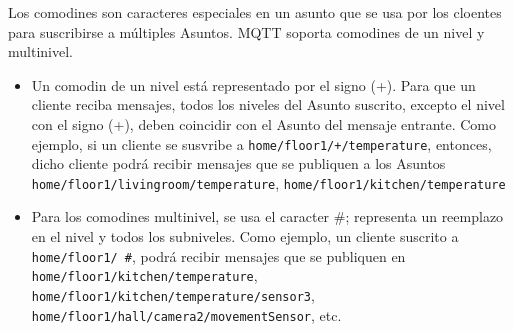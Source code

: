 Los comodines son caracteres especiales en un asunto que se usa por los cloentes para suscribirse a múltiples Asuntos. MQTT soporta comodines de un nivel y multinivel.

\begin{itemize}
    \item Un comodin de un nivel está representado por el signo (+). Para que un cliente reciba mensajes, todos los niveles del Asunto suscrito, excepto el nivel con el signo (+), deben coincidir con el Asunto del mensaje entrante. Como ejemplo, si un cliente se susvribe a \texttt{home/floor1/+/temperature}, entonces, dicho cliente podrá recibir mensajes que se publiquen a los Asuntos \texttt{home/floor1/livingroom/temperature}, \texttt{home/floor1/kitchen/temperature}
    \item Para los comodines multinivel, se usa el caracter \#; representa un reemplazo en el nivel y todos los subniveles. Como ejemplo, un cliente suscrito a \texttt{home/floor1/ \#}, podrá recibir mensajes que se publiquen en \texttt{home/floor1/kitchen/temperature}, \texttt{home/floor1/kitchen/temperature/sensor3}, \texttt{home/floor1/hall/camera2/movementSensor}, etc. 
\end{itemize}